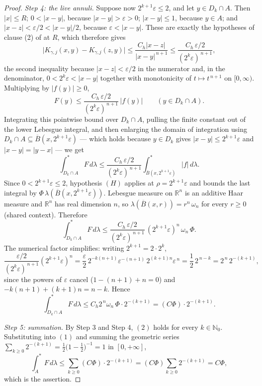 \begin{proof}
\emph{Step 4: the live annuli.}  Suppose now $2^{k+1}\varepsilon \leq 2$, and
let $y \in D_k \cap A$.  Then $|x| \leq R$; $0 < |x-y|$, because
$|x-y| > \varepsilon > 0$; $|x-y| \leq 1$, because $y \in A$; and
$|x-z| < \varepsilon/2 < |x-y|/2$, because $\varepsilon < |x-y|$.  These are
exactly the hypotheses of clause (2) of  at
$R$, which therefore gives
\[
  \bigl|K_{\gamma,j}(x,y)-K_{\gamma,j}(z,y)\bigr|
    \leq \frac{C_h|x-z|}{|x-y|^{\,n+1}}
    \leq \frac{C_h\,\varepsilon/2}{(2^k\varepsilon)^{\,n+1}} ,
\]
the second inequality because $|x-z| < \varepsilon/2$ in the numerator and,
in the denominator, $0 < 2^k\varepsilon < |x-y|$ together with monotonicity of
$t \mapsto t^{\,n+1}$ on $[0,\infty)$.  Multiplying by $|f(y)| \geq 0$,
\[
  F(y) \leq \frac{C_h\,\varepsilon/2}{(2^k\varepsilon)^{\,n+1}}\,|f(y)|
  \qquad (y \in D_k \cap A) .
\]
Integrating this pointwise bound over $D_k \cap A$, pulling the finite constant
out of the lower Lebesgue integral, and then enlarging the domain of
integration using $D_k \cap A \subseteq \overline B(x,2^{k+1}\varepsilon)$ ---
which holds because $y \in D_k$ gives $|x-y| \leq 2^{k+1}\varepsilon$ and
$|x-y| = |y-x|$ --- we get
\[
  \int_{D_k\cap A}^{*}F\,d\lambda
    \leq \frac{C_h\,\varepsilon/2}{(2^k\varepsilon)^{\,n+1}}
      \int_{\overline B(x,2^{k+1}\varepsilon)}^{*}|f|\,d\lambda .
\]
Since $0 < 2^{k+1}\varepsilon \leq 2$, hypothesis $(H)$ applies at
$\rho = 2^{k+1}\varepsilon$ and bounds the last integral by
$\Phi\,\lambda(\overline B(x,2^{k+1}\varepsilon))$.  Lebesgue measure on
$\mathbb{R}^n$ is an additive Haar measure and $\mathbb{R}^n$ has real dimension
$n$, so $\lambda(\overline B(x,r)) = r^n\,\omega_n$ for every $r \geq 0$ (shared
context).  Therefore
\[
  \int_{D_k\cap A}^{*}F\,d\lambda
    \leq \frac{C_h\,\varepsilon/2}{(2^k\varepsilon)^{\,n+1}}
      \,(2^{k+1}\varepsilon)^n\,\omega_n\,\Phi .
\]
The numerical factor simplifies: writing $2^{k+1} = 2\cdot2^k$,
\[
  \frac{\varepsilon/2}{(2^k\varepsilon)^{\,n+1}}(2^{k+1}\varepsilon)^n
    = \frac{\varepsilon}{2}\,2^{-k(n+1)}\varepsilon^{-(n+1)}
      \,2^{(k+1)n}\varepsilon^{\,n}
    = \frac{1}{2}\,2^{\,n-k}
    = 2^{\,n}\,2^{-(k+1)} ,
\]
since the powers of $\varepsilon$ cancel ($1 - (n+1) + n = 0$) and
$-k(n+1)+(k+1)n = n-k$.  Hence
\begin{equation*}
  \int_{D_k\cap A}^{*}F\,d\lambda
    \leq C_h2^{\,n}\omega_n\,\Phi\cdot2^{-(k+1)}
    = (C\Phi)\cdot2^{-(k+1)} . \tag{2}
\end{equation*}

\emph{Step 5: summation.}  By Step 3 and Step 4, $(2)$ holds for every
$k \in \mathbb{N}_0$.  Substituting into $(1)$ and summing the geometric series
$\sum_{k\geq0}2^{-(k+1)} = \tfrac12\bigl(1-\tfrac12\bigr)^{-1} = 1$ in
$[0,+\infty]$,
\[
  \int_A^{*}F\,d\lambda
    \leq \sum_{k\geq0}(C\Phi)\cdot2^{-(k+1)}
    = (C\Phi)\sum_{k\geq0}2^{-(k+1)}
    = C\Phi ,
\]
which is the assertion.
\end{proof}
